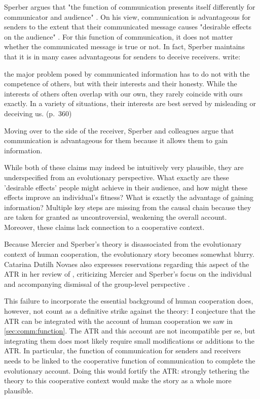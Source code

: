 Sperber argues that "the function of communication presents itself differently for communicator and audience" \citep[p.~411]{Sperber01}. On his view, communication is advantageous for senders to the extent that their communicated message causes "desirable effects on the audience" \citep[p.~406]{Sperber01}. For this function of communication, it does not matter whether the communicated message is true or not. In fact, Sperber maintains that it is in many cases advantageous for senders to deceive receivers. \citet{Sperber10} write:
\begin{quoting}
    the major problem posed by communicated information has to do not with the
competence of others, but with their interests and their honesty. While the interests of others often overlap with our own, they rarely coincide with ours exactly. In a variety of situations, their interests are best served by misleading or deceiving us.
    \hfill (p.~360)
\end{quoting}
Moving over to the side of the receiver, Sperber and colleagues argue that communication is advantageous for them because it allows them to gain information.

While both of these claims may indeed be intuitively very plausible, they are underspecified from an evolutionary perspective. What exactly are these 'desirable effects' people might achieve in their audience, and how might these effects improve an individual's fitness? What is exactly the advantage of gaining information? Multiple key steps are missing from the causal chain because they are taken for granted as uncontroversial, weakening the overall account. Moreover, these claims lack connection to a cooperative context.

Because Mercier and Sperber's theory is disassociated from the evolutionary context of human cooperation, the evolutionary story becomes somewhat blurry.
Catarina Dutilh Novaes also expresses reservations regarding this aspect of the ATR in her \citeyear{Novaes18} review of \citet{MS17}, criticizing Mercier and Sperber's focus on the individual and accompanying dismissal of the group-level perspective \citep[\S 3.3]{Novaes18}.

This failure to incorporate the essential background of human cooperation does, however, not count as a definitive strike against the theory: I conjecture that the ATR can be integrated with the account of human cooperation we saw in \cref{sec:comm:function}. The ATR and this account are not incompatible per se, but integrating them does most likely require small modifications or additions to the ATR. In particular, the function of communication for senders and receivers needs to be linked to the cooperative function of communication to complete the evolutionary account.
Doing this would fortify the ATR: strongly tethering the theory to this cooperative context would make the story as a whole more plausible.

